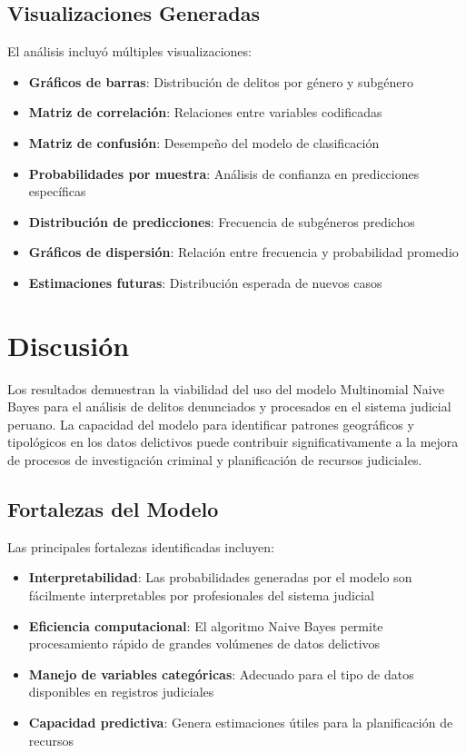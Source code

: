 \documentclass[conference]{IEEEtran}
\begin{document}
\subsection{Visualizaciones Generadas}

El análisis incluyó múltiples visualizaciones:

\begin{itemize}
\item \textbf{Gráficos de barras}: Distribución de delitos por género y subgénero
\item \textbf{Matriz de correlación}: Relaciones entre variables codificadas
\item \textbf{Matriz de confusión}: Desempeño del modelo de clasificación
\item \textbf{Probabilidades por muestra}: Análisis de confianza en predicciones específicas
\item \textbf{Distribución de predicciones}: Frecuencia de subgéneros predichos
\item \textbf{Gráficos de dispersión}: Relación entre frecuencia y probabilidad promedio
\item \textbf{Estimaciones futuras}: Distribución esperada de nuevos casos
\end{itemize}

\section{Discusión}

Los resultados demuestran la viabilidad del uso del modelo Multinomial Naive Bayes para el análisis de delitos denunciados y procesados en el sistema judicial peruano. La capacidad del modelo para identificar patrones geográficos y tipológicos en los datos delictivos puede contribuir significativamente a la mejora de procesos de investigación criminal y planificación de recursos judiciales.

\subsection{Fortalezas del Modelo}

Las principales fortalezas identificadas incluyen:

\begin{itemize}
\item \textbf{Interpretabilidad}: Las probabilidades generadas por el modelo son fácilmente interpretables por profesionales del sistema judicial
\item \textbf{Eficiencia computacional}: El algoritmo Naive Bayes permite procesamiento rápido de grandes volúmenes de datos delictivos
\item \textbf{Manejo de variables categóricas}: Adecuado para el tipo de datos disponibles en registros judiciales
\item \textbf{Capacidad predictiva}: Genera estimaciones útiles para la planificación de recursos
\end{itemize}
\end{document}
